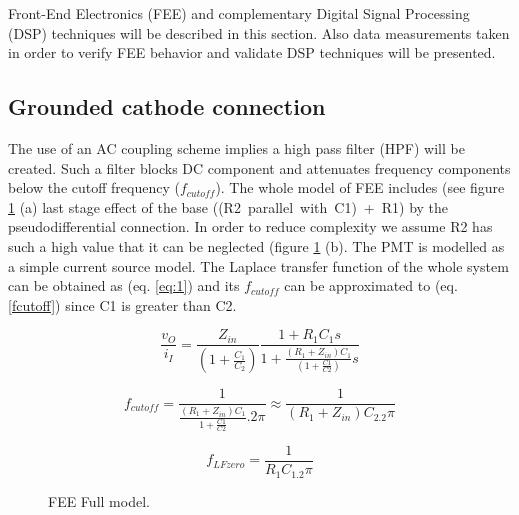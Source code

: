 \documentclass[a4paper, 10pt, oneside, twocolumn, 3p]{elsarticle}
\begin{document}
\par Front-End Electronics (FEE) and complementary Digital Signal Processing (DSP) techniques will be described in this section. Also data measurements taken in order to verify FEE behavior and validate DSP techniques will be presented. 


\subsection{Grounded cathode connection}

\par The use of an AC coupling scheme implies a high pass filter (HPF) will be created. Such a filter blocks DC component and attenuates frequency components below the cutoff frequency ($f_{cutoff}$). The whole model of FEE includes (see figure \ref{fig:FEE_PMT} (a) last stage effect of the base \mbox{((R2 parallel with C1) + R1)} by the pseudodifferential connection. In order to reduce complexity we assume R2 has such a high value that it can be neglected (figure \ref{fig:FEE_PMT} (b). The PMT is modelled as a simple current source model. The Laplace transfer function of the whole system can be obtained as (eq. \ref{eq:1}) and its $f_{cutoff}$ can be approximated to (eq. \ref{fcutoff}) since C1 is greater than C2.  


\begin{equation}
\frac{v_O}{i_I} = \frac{Z_{in}}{(1+\frac{C_1}{C_2})}\frac{1+R_1C_1s}{1+\frac{(R_1+Z_{in})C_1}{(1+\frac{C1}{C2})}s} 
\label{eq:1}
\end{equation}


\begin{equation}
f_{cutoff}=\frac{1}{\frac{(R_1+Z_{in})C_1}{1+\frac{C1}{C2}}.2\pi} \approx \frac{1}{(R_1+Z_{in})C_2.2\pi}
\label{fcutoff}
\end{equation}

\begin{equation}
f_{LFzero}=\frac{1}{R_1 C_1.2\pi}
\label{fzero}
\end{equation}


\begin{figure}[!tbp]
	\centering
	\hfill
	\caption{FEE Full model.}
	\label{fig:FEE_PMT}
\end{figure}
\end{document}

